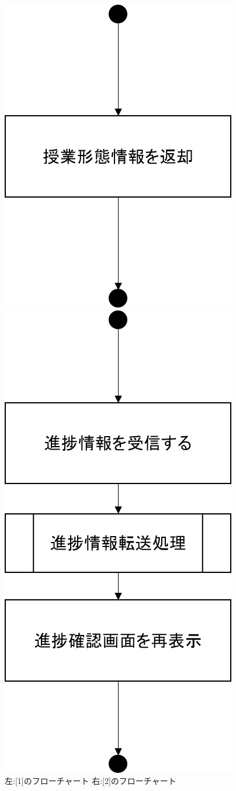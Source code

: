 \begin{figure}[htbp]
 \begin{minipage}{0.5\hsize}
  \begin{center}
   \includegraphics[width=0.45\linewidth,clip]{./img/preg_check/sub1.png}
  \end{center}
 \end{minipage}
 \begin{minipage}{0.5\hsize}
  \begin{center}
   \includegraphics[width=0.45\linewidth,clip]{./img/preg_check/sub2.png}
  \end{center}
 \end{minipage}
 \caption{左:[1]のフローチャート 右:[2]のフローチャート}\label{fig:pregcheckflow0}
\end{figure}

